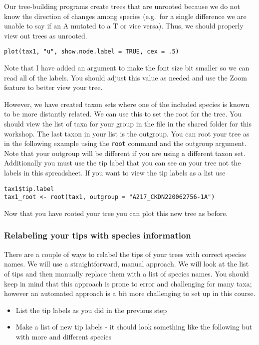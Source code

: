 \documentclass[
]{book}
\providecommand{\tightlist}{%
  \setlength{\itemsep}{0pt}\setlength{\parskip}{0pt}}
\begin{document}
Our tree-building programs create trees that are unrooted because we do not know the direction of changes among species (e.g.~for a single difference we are unable to say if an A mutated to a T or vice versa).
Thus, we should properly view out trees as unrooted.

\begin{verbatim}
plot(tax1, "u", show.node.label = TRUE, cex = .5)
\end{verbatim}

Note that I have added an argument to make the font size bit smaller so we can read all of the labels.
You should adjust this value as needed and use the Zoom feature to better view your tree.

However, we have created taxon sets where one of the included species is known to be more distantly related.
We can use this to set the root for the tree.
You should view the list of taxa for your group in the file in the shared folder for this workshop.
The last taxon in your list is the outgroup.
You can root your tree as in the following example using the \texttt{root} command and the outgroup argument.
Note that your outgroup will be different if you are using a different taxon set.
Additionally you must use the tip label that you can see on your tree not the labels in this spreadsheet.
If you want to view the tip labels as a list use

\begin{verbatim}
tax1$tip.label
tax1_root <- root(tax1, outgroup = "A217_CKDN220062756-1A")
\end{verbatim}

Now that you have rooted your tree you can plot this new tree as before.

\hypertarget{relabeling-your-tips-with-species-information}{%
\subsubsection{Relabeling your tips with species information}\label{relabeling-your-tips-with-species-information}}

There are a couple of ways to relabel the tips of your trees with correct species names.
We will use a straightforward, manual approach.
We will look at the list of tips and then manually replace them with a list of species names.
You should keep in mind that this approach is prone to error and challenging for many taxa; however an automated approach is a bit more challenging to set up in this course.

\begin{itemize}
\tightlist
\item
  List the tip labels as you did in the previous step
\item
  Make a list of new tip labels - it should look something like the following but with more and different species
\end{itemize}
\end{document}
